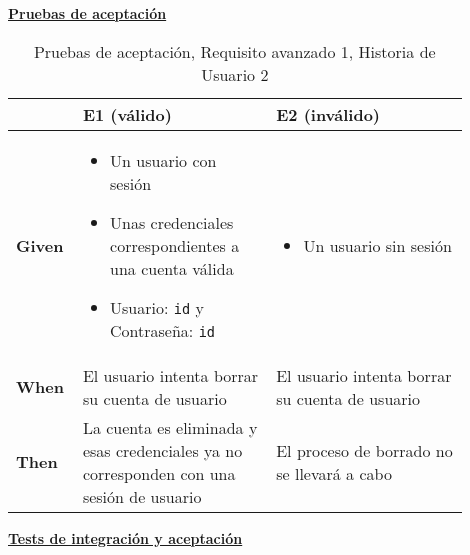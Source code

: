 \documentclass[../ei103948-project-documentation.tex]{subfiles}
\begin{document}
\begin{center}
						\textbf{\underline{Pruebas de aceptación}}
						\begin{table}[H]
							\centering
							\begin{tabular}{|p{0.10\linewidth}|p{0.40\linewidth}|p{0.40\linewidth}|}
								\hline
								\textbf{}      & \textbf{E1 (válido)}                                                                                & \textbf{E2 (inválido)}                                                                                 \\ \hline
								\textbf{Given} & 
								\begin{itemize}\vspace{-5mm}\setlength\itemsep{0mm}\setlength\parskip{0mm}\setlength{\itemindent}{-5mm}
									\item Un usuario con sesión
									\item Unas credenciales correspondientes a una cuenta válida
									\item Usuario: \texttt{id} y Contraseña: \texttt{id}
								\end{itemize} & 
								\begin{itemize}\vspace{-5mm}\setlength\itemsep{0mm}\setlength\parskip{0mm}\setlength{\itemindent}{-5mm}
									\item Un usuario sin sesión								\end{itemize} \\ \hline
								\textbf{When}  & El usuario intenta borrar su cuenta de usuario                                                      & El usuario intenta borrar su cuenta de usuario                                                         \\ \hline
								\textbf{Then}  & La cuenta es eliminada y esas credenciales ya no corresponden con una sesión de usuario                & El proceso de borrado no se llevará a cabo                                                             \\ \hline
								\end{tabular}
							\caption{Pruebas de aceptación, Requisito avanzado 1, Historia de Usuario 2}
						\end{table}
						\end{center}


					\begin{center}
						\textbf{\underline{Tests de integración y aceptación}}
					\end{center}

					\testAvanzadoB
\end{document}
